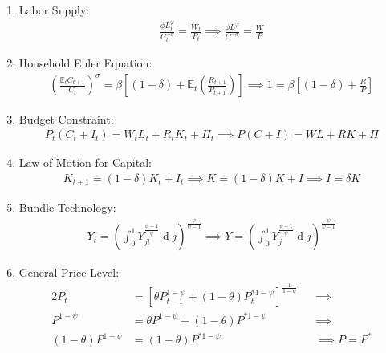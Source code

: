 \documentclass[
	12pt,
	]{article}
\numberwithin{equation}{section}
\DeclareMathOperator{\dif}{d}
\theoremstyle{definition}
\theoremstyle{plain}
\theoremstyle{plain}
\theoremstyle{plain}
\begin{document}
\begin{enumerate}
	\item Labor Supply:
	\begin{align}
	\label{eq:ss-household-labor-supply}
		\frac{\phi L_t^{\varphi}}{C_t^{-\sigma}} = \frac{W_t}{P_t} \implies
		\frac{\phi L^{\varphi}}{C^{-\sigma}} = \frac{W}{P}
	\end{align}
	
	\item Household Euler Equation: 
	\begin{align}
	\label{eq:ss-household-euler-equation}
		\left( \frac{\mathbb{E}_t C_{t+1}}{C_t} \right)^\sigma = \beta \left[ (1-\delta) + \mathbb{E}_t \left(\frac{R_{t+1}}{P_{t+1}}\right) \right] \implies 
		1 = \beta \left[ (1-\delta) + \frac{R}{P} \right]
	\end{align}
	
	\item Budget Constraint: 
	\begin{align}
	\label{eq:ss-household-budget-constraint}
		P_t (C_t + I_t) = W_t L_t + R_t K_t + \Pi_t \implies 
		P (C + I) = W L + R K + \Pi
	\end{align}
	
	\item Law of Motion for Capital:
	\begin{align}
	\label{eq:ss-law-of-motion-for-capital}
		K_{t+1} = (1-\delta)K_t + I_t \implies
		K = (1-\delta)K + I \implies I = \delta K
	\end{align}
	
	\item Bundle Technology:
	\begin{align}
	\label{eq:ss-final-good-firm-bundle-rule}
		Y_t = \left( \int_{0}^{1} Y_{jt}^{\frac{\psi-1}{\psi}} \dif j \right)^{\frac{\psi}{\psi-1}} \implies 
		Y = \left( \int_{0}^{1} Y_{j}^{\frac{\psi-1}{\psi}} \dif j \right)^{\frac{\psi}{\psi-1}}
	\end{align}
	
	\item General Price Level:
	\begin{alignat}{2}
	\label{eq:ss-general-price-level}
		P_t &= \left[ \theta P_{t-1}^{1-\psi} + (1-\theta) P_t^{\ast 1-\psi} \right]^\frac{1}{1-\psi} &&\implies \nonumber \\
		P^{1-\psi} &= \theta P^{1-\psi} + (1-\theta) P^{\ast 1-\psi} &&\implies \nonumber \\ 
		(1-\theta) P^{1-\psi} &= (1-\theta) P^{\ast 1-\psi} &&\implies P = P^\ast
	\end{alignat}
	

\end{enumerate}
\end{document}
